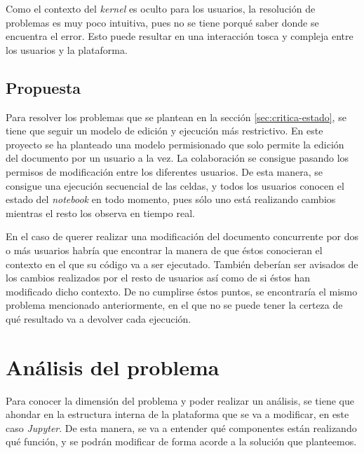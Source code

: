 \documentclass[11pt,spanish,listoffigures]{tfgetsinf}
\begin{document}
Como el contexto del \textit{kernel} es oculto para los usuarios, la resolución de problemas es muy poco intuitiva, pues no se tiene porqué saber donde se encuentra el error. Esto puede resultar en una interacción tosca y compleja entre los usuarios y la plataforma.



\section{Propuesta}
\label{sec:propuesta}

Para resolver los problemas que se plantean en la sección \ref{sec:critica-estado}, se tiene que seguir un modelo de edición y ejecución más restrictivo. En este proyecto se ha planteado una modelo permisionado que solo permite la edición del documento por un usuario a la vez. La colaboración se consigue pasando los permisos de modificación entre los diferentes usuarios. De esta manera, se consigue una ejecución secuencial de las celdas, y todos los usuarios conocen el estado del \textit{notebook} en todo momento, pues sólo uno está realizando cambios mientras el resto los observa en tiempo real.

En el caso de querer realizar una modificación del documento concurrente por dos o más usuarios habría que encontrar la manera de que éstos conocieran el contexto en el que su código va a ser ejecutado. También deberían ser avisados de los cambios realizados por el resto de usuarios así como de si éstos han modificado dicho contexto. De no cumplirse éstos puntos, se encontraría el mismo problema mencionado anteriormente, en el que no se puede tener la certeza de qué resultado va a devolver cada ejecución.




\chapter{Análisis del problema}
\label{ch:analisis-problema}

Para conocer la dimensión del problema y poder realizar un análisis, se tiene que ahondar en la estructura interna de la plataforma que se va  a modificar, en este caso \textit{Jupyter}. De esta manera, se va a entender qué componentes están realizando qué función, y se podrán modificar de forma acorde a la solución que planteemos.
\end{document}
